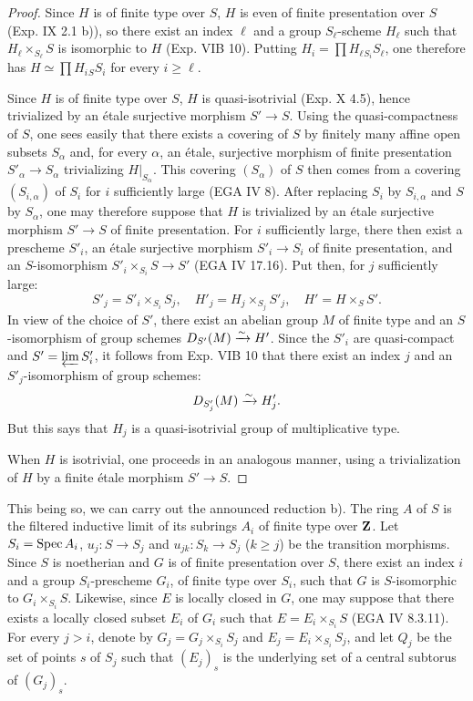 \begin{proof}
Since $H$ is of finite type over $S$, $H$ is even of finite presentation over $S$ (Exp. IX 2.1 b)), so there exist an index $\ell$ and a group $S_\ell$-scheme $H_\ell$ such that $H_\ell\times_{S_\ell}S$ is isomorphic to $H$ (Exp. VIB 10). Putting $H_i=\prod H_\ell{}_{S_i}S_\ell$, one therefore has $H\simeq\prod H_i{}_{S}S_i$ for every $i\geq\ell$.

Since $H$ is of finite type over $S$, $H$ is quasi-isotrivial (Exp. X 4.5), hence trivialized by an \'etale surjective morphism $S'\to S$. Using the quasi-compactness of $S$, one sees easily that there exists a covering of $S$ by finitely many affine open subsets $S_\alpha$ and, for every $\alpha$, an \'etale, surjective morphism of finite presentation $S'_\alpha\to S_\alpha$ trivializing $H|_{S_\alpha}$. This covering $(S_\alpha)$ of $S$ then comes from a covering $(S_{i,\alpha})$ of $S_i$ for $i$ sufficiently large (EGA IV 8). After replacing $S_i$ by $S_{i,\alpha}$ and $S$ by $S_\alpha$, one may therefore suppose that $H$ is trivialized by an \'etale surjective morphism $S'\to S$ of finite presentation. For $i$ sufficiently large, there then exist a prescheme $S'_i$, an \'etale surjective morphism $S'_i\to S_i$ of finite presentation, and an $S$-isomorphism $S'_i\times_{S_i}S\to S'$ (EGA IV 17.16). Put then, for $j$ sufficiently large:
\[
S'_j=S'_i\times_{S_i}S_j,\quad H'_j=H_j\times_{S_j}S'_j,\quad H'=H\times_S S'.
\]
In view of the choice of $S'$, there exist an abelian group $M$ of finite type and an $S$-isomorphism of group schemes $D_{S'}(M)\xrightarrow{\sim} H'$. Since the $S'_i$ are quasi-compact and $S'=\varprojlim S'_i$, it follows from Exp. VIB 10 that there exist an index $j$ and an $S'_j$-isomorphism of group schemes:
\[
D_{S'_j}(M)\xrightarrow{\sim} H'_j.
\]
But this says that $H_j$ is a quasi-isotrivial group of multiplicative type.

When $H$ is isotrivial, one proceeds in an analogous manner, using a trivialization of $H$ by a finite \'etale morphism $S'\to S$.
\end{proof}

This being so, we can carry out the announced reduction b). The ring $A$ of $S$ is the filtered inductive limit of its subrings $A_i$ of finite type over $\mathbf{Z}$. Let $S_i=\operatorname{Spec} A_i$, $u_j:S\to S_j$ and $u_{jk}:S_k\to S_j$ ($k\geq j$) be the transition morphisms. Since $S$ is noetherian and $G$ is of finite presentation over $S$, there exist an index $i$ and a group $S_i$-prescheme $G_i$, of finite type over $S_i$, such that $G$ is $S$-isomorphic to $G_i\times_{S_i}S$. Likewise, since $E$ is locally closed in $G$, one may suppose that there exists a locally closed subset $E_i$ of $G_i$ such that $E=E_i\times_{S_i}S$ (EGA IV 8.3.11). For every $j>i$, denote by $G_j=G_j\times_{S_i}S_j$ and $E_j=E_i\times_{S_i}S_j$, and let $Q_j$ be the set of points $s$ of $S_j$ such that $(E_j)_s$ is the underlying set of a central subtorus of $(G_j)_s$.

